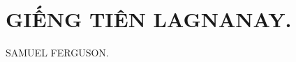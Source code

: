 \section{GIẾNG TIÊN LAGNANAY.}

\begin{large}
  \begin{center}
    \uppercase{Samuel Ferguson.}
  \end{center}
\end{large}




